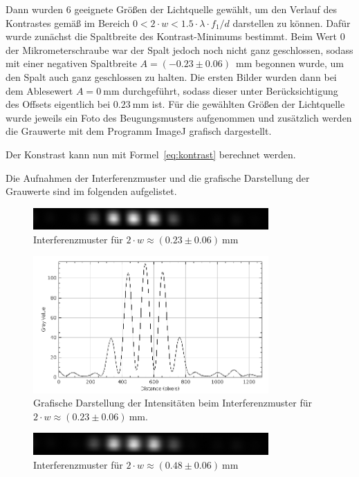 \documentclass{article}
\begin{document}
Dann wurden 6 geeignete Größen der Lichtquelle gewählt, um den Verlauf des Kontrastes gemäß im Bereich $0 < 2\cdot w < 1.5 \cdot \lambda\cdot f_1 / d$ darstellen zu können. Dafür wurde zunächst die Spaltbreite des Kontrast-Minimums bestimmt. Beim Wert 0 der Mikrometerschraube war der Spalt jedoch noch nicht ganz geschlossen, sodass mit einer negativen Spaltbreite $A=(-0.23 \pm 0.06)$~mm begonnen wurde, um den Spalt auch ganz geschlossen zu halten. Die ersten Bilder wurden dann bei dem Ablesewert $A=0~$mm durchgeführt, sodass dieser unter Berücksichtigung des Offsets eigentlich bei $0.23~$mm ist.
Für die gewählten Größen der Lichtquelle wurde jeweils ein Foto des Beugungsmusters aufgenommen und zusätzlich werden die Grauwerte mit dem Programm ImageJ grafisch dargestellt.

Der Konstrast kann nun mit Formel~\ref{eq:kontrast} berechnet werden.

Die Aufnahmen der Interferenzmuster und die grafische Darstellung der Grauwerte sind im folgenden aufgelistet.

\begin{figure}[H]
\centering
\caption{Interferenzmuster für $2\cdot w \approx (0.23\pm0.06)~$mm}
\includegraphics[width=9cm]{moodle/img2.png}
\end{figure}

\begin{figure}[H]
\centering
\caption{Grafische Darstellung der Intensitäten beim Interferenzmuster für $2\cdot w \approx (0.23\pm0.06)~$mm.}
\includegraphics[width=9cm]{moodle/img2_graph.png}
\end{figure}



\begin{figure}[H]
\centering
\caption{Interferenzmuster für $2\cdot w \approx (0.48\pm0.06)~$mm}
\includegraphics[width=9cm]{moodle/img3.png}
\end{figure}
\end{document}

